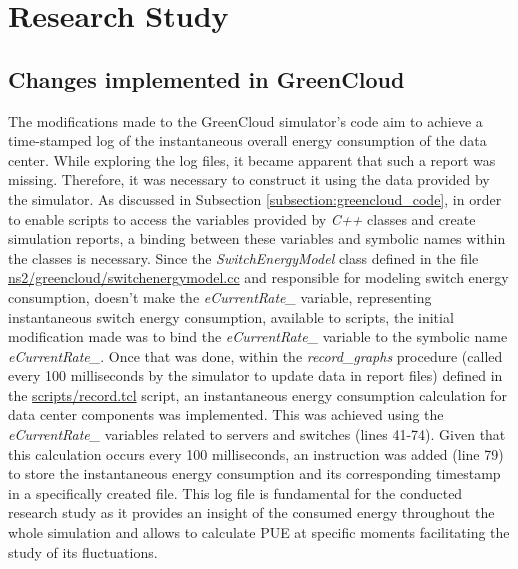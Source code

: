 \chapter{Research Study} \label{chapter:research_study}

\begin{citazione}

\end{citazione}
\newpage

\section{Changes implemented in GreenCloud}\label{section:greencloud_mod}
The modifications made to the GreenCloud simulator's code aim to achieve a time-stamped log of the instantaneous overall energy consumption of the data center. While exploring the log files, it became apparent that such a report was missing. Therefore, it was necessary to construct it using the data provided by the simulator. As discussed in Subsection \ref{subsection:greencloud_code}, in order to enable scripts to access the variables provided by \emph{C++} classes and create simulation reports, a binding between these variables and symbolic names within the classes is necessary. Since the \emph{SwitchEnergyModel} class defined in the file \href{https://github.com/vincenzo-emanuele/masters-degree-thesis/blob/main/greencloud_modified_src/ns2/greencloud/switchenergymodel.cc}{ns2/greencloud/switchenergymodel.cc} and responsible for modeling switch energy consumption, doesn't make the \emph{eCurrentRate\_} variable, representing instantaneous switch energy consumption, available to scripts, the initial modification made was to bind the \emph{eCurrentRate\_} variable to the symbolic name \emph{eCurrentRate\_}. Once that was done, within the \emph{record\_graphs} procedure (called every 100 milliseconds by the simulator to update data in report files) defined in the \href{https://github.com/vincenzo-emanuele/masters-degree-thesis/blob/main/greencloud\_modified\_src/scripts/record.tcl}{scripts/record.tcl} script, an instantaneous energy consumption calculation for data center components was implemented. This was achieved using the \emph{eCurrentRate\_} variables related to servers and switches (lines 41-74). Given that this calculation occurs every 100 milliseconds, an instruction was added (line 79) to store the instantaneous energy consumption and its corresponding timestamp in a specifically created file. This log file is fundamental for the conducted research study as it provides an insight of the consumed energy throughout the whole simulation and allows to calculate PUE at specific moments facilitating the study of its fluctuations.





